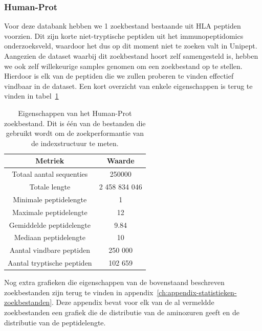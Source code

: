 \documentclass[11pt,dutch,faculty=we,layout=titlefont,underline=false,titleUppercase=true,titleUnderline=true]{ugent2016-report}
\begin{document}
    \subsubsection{Human-Prot}
    Voor deze databank hebben we 1 zoekbestand bestaande uit HLA peptiden voorzien.
    Dit zijn korte niet-tryptische peptiden uit het immunopeptidomics onderzoeksveld, waardoor het dus op dit moment niet te zoeken valt in Unipept.
    Aangezien de dataset waarbij dit zoekbestand hoort zelf samengesteld is, hebben we ook zelf willekeurige samples genomen om een zoekbestand op te stellen.
    Hierdoor is elk van de peptiden die we zullen proberen te vinden effectief vindbaar in de dataset.
    Een kort overzicht van enkele eigenschappen is terug te vinden in tabel~\ref{tab:humanprot_zoekbestand}

    \begin{table}[h!]
        \centering
        \begin{tabular}{ c c }
            Metriek                    & Waarde        \\
            \hline\hline
            Totaal aantal sequenties   & 250000        \\
            Totale lengte              & 2 458 834 046 \\
            Minimale peptidelengte     & 1             \\
            Maximale peptidelengte     & 12            \\
            Gemiddelde peptidelengte   & 9.84          \\
            Mediaan peptidelengte      & 10            \\
            Aantal vindbare peptiden   & 250 000       \\
            Aantal tryptische peptiden & 102 659       \\
            \hline
        \end{tabular}
        \caption{Eigenschappen van het Human-Prot zoekbestand. Dit is één van de bestanden die gebruikt wordt om de zoekperformantie van de indexstructuur te meten.}
        \label{tab:humanprot_zoekbestand}
    \end{table}


    Nog extra grafieken die eigenschappen van de bovenstaand beschreven zoekbestanden zijn terug te vinden in appendix~\ref{ch:appendix-statistieken-zoekbestanden}.
    Deze appendix bevat voor elk van de al vermeldde zoekbestanden een grafiek die de distributie van de aminozuren geeft en de distributie van de peptidelengte.
\end{document}

